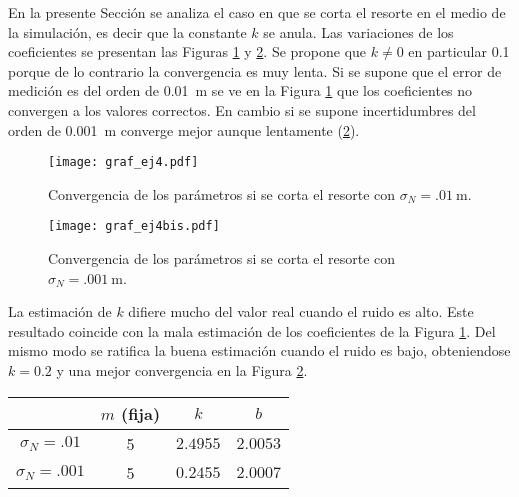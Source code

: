 	En la presente Sección se analiza el caso en que se corta el resorte en el medio de la simulación, es decir que la constante $k$ se anula. Las variaciones de los coeficientes se presentan las Figuras \ref{fig:ej4} y \ref{fig:ej4bis}. 
	Se propone que $k\neq0$ en particular \num{.1} porque de lo contrario la convergencia es muy lenta. Si se supone que el error de medición es del orden de \SI{.01}{\m} se ve en la Figura \ref{fig:ej4} que los coeficientes no convergen a los valores correctos. En cambio si se supone incertidumbres del orden de \SI{0.001}{\m} converge mejor aunque lentamente (\ref{fig:ej4bis}). 

	\begin{figure}[h!]
		\centering
		\texttt{[image: graf\_ej4.pdf]}
		\caption{Convergencia de los parámetros si se corta el resorte con $\sigma_N = \SI{.01}{\m}$.}
		\label{fig:ej4}
	\end{figure}

	\begin{figure}[h!]
		\centering
		\texttt{[image: graf\_ej4bis.pdf]}
		\caption{Convergencia de los parámetros si se corta el resorte con $\sigma_N = \SI{.001}{\m}$.}
		\label{fig:ej4bis}
	\end{figure}


		La estimación de $k$ difiere mucho del valor real cuando el ruido es alto. Este resultado coincide con la mala estimación de los coeficientes de la Figura \ref{fig:ej4}. Del mismo modo se ratifica la buena estimación cuando el ruido es bajo, obteniendose $k=\num{0.2}$ y una mejor convergencia en la Figura \ref{fig:ej4bis}.
		
		\begin{table}[h!]
			\centering
			\begin{tabular}{cccc}
				\toprule
				&$m$ (fija)	& $k$	& $b$\\
				\midrule
				$\sigma_N=\num{.01}$&5&$\num{2.4955}$&$\num{2.0053}$\\
				$\sigma_N=\num{.001}$&5&$\num{0.2455}$&$\num{2.0007}$\\
				\bottomrule
			\end{tabular}
		\end{table}
